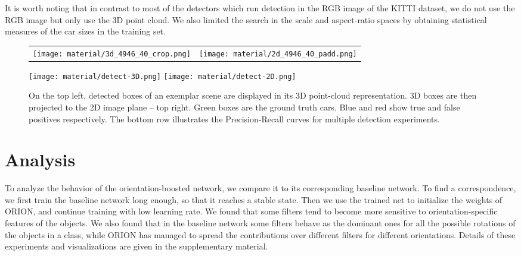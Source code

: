 \documentclass{bmvc2k}
\begin{document}
It is worth noting that in contrast to most of the detectors which run detection in the RGB image of the KITTI dataset, we do not use the RGB image but only use the 3D point cloud. We also limited the search in the scale and aspect-ratio spaces by obtaining statistical measures of the car sizes in the training set.
\begin{figure}[!t]
    \begin{center}
        \begin{tabular}{cc}
            {\texttt{[image: material/3d\_4946\_40\_crop.png]}}
            &
            {\texttt{[image: material/2d\_4946\_40\_padd.png]}}
        \end{tabular}
        \vspace{-.5cm}
    \end{center}
  \begin{center}
    \texttt{[image: material/detect-3D.png]}
    \texttt{[image: material/detect-2D.png]}
  \end{center}
  \caption{On the top left, detected boxes of an exemplar scene are displayed in its 3D point-cloud representation. 3D boxes are then projected to the 2D image plane -- top right. Green boxes are the ground truth cars. Blue and red show true and false positives respectively. The bottom row illustrates the Precision-Recall curves for multiple detection experiments.}
  \label{fig:pr_curve}
\end{figure}

\section{Analysis}
To analyze the behavior of the orientation-boosted network, we compare it to its corresponding baseline network. To find a correspondence, we first train the baseline network long enough, so that it reaches a stable state. Then we use the trained net to initialize the weights of ORION, and continue training with low learning rate. We found that some filters tend to become more sensitive to orientation-specific features of the objects. We also found that in the baseline network some filters behave as the dominant ones for all the possible rotations of the objects in a class, while ORION has managed to spread the contributions over different filters for different orientations. Details of these experiments and visualizations are given in the supplementary material.
\end{document}
